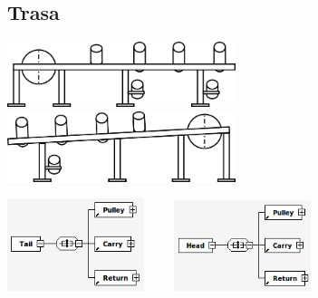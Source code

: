 \documentclass{beamer}
\begin{document}
\subsection{Trasa}
\begin{frame}
\begin{center}
\includegraphics[width=0.5\textwidth]{png/zwrotnia}~~~~
\includegraphics[width=0.5\textwidth]{png/wysiegnik}

\pause

\includegraphics[width=0.3\textwidth]{png/zwrotnia_xsd}~~~~
\includegraphics[width=0.3\textwidth]{png/wysiegnik_xsd}

\end{center}
\end{frame}
\end{document}

